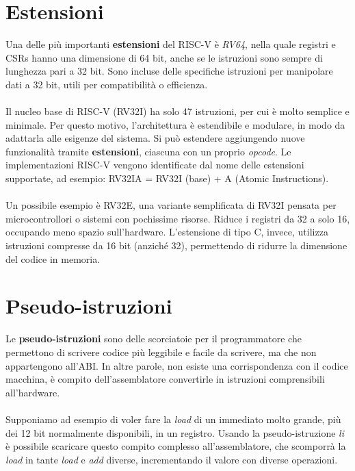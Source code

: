 \section{Estensioni}
Una delle più importanti \textbf{estensioni} del RISC-V è \textit{RV64}, nella quale registri e CSRs hanno una dimensione di 64 bit, anche se le istruzioni sono sempre di lunghezza pari a 32 bit. Sono incluse delle specifiche istruzioni per manipolare dati a 32 bit, utili per compatibilità o efficienza.
\\
\\
Il nucleo base di RISC-V (RV32I) ha solo 47 istruzioni, per cui è molto semplice e minimale. Per questo motivo, l'architettura è estendibile e modulare, in modo da adattarla alle esigenze del sistema. Si può estendere aggiungendo nuove funzionalità tramite \textbf{estensioni}, ciascuna con un proprio \textit{opcode}. Le implementazioni RISC-V vengono identificate dal nome delle estensioni supportate, ad esempio: RV32IA = RV32I (base) + A (Atomic Instructions).
\\
\\
Un possibile esempio è RV32E, una variante semplificata di RV32I pensata per microcontrollori o sistemi con pochissime risorse. Riduce i registri da 32 a solo 16, occupando meno spazio sull’hardware. L'estensione di tipo C, invece, utilizza istruzioni compresse da 16 bit (anziché 32), permettendo di ridurre la dimensione del codice in memoria.

\section{Pseudo-istruzioni}
\label{subsec:pseudo}
Le \textbf{pseudo-istruzioni} sono delle scorciatoie per il programmatore che permettono di scrivere codice più leggibile e facile da scrivere, ma che non appartengono all'ABI. In altre parole, non esiste una corrispondenza con il codice macchina, è compito dell'assemblatore convertirle in istruzioni comprensibili all'hardware.
\\
\\
Supponiamo ad esempio di voler fare la \textit{load} di un immediato molto grande, più dei 12 bit normalmente disponibili, in un registro. Usando la pseudo-istruzione \textit{li} è possibile scaricare questo compito complesso all'assemblatore, che scomporrà la \textit{load} in tante \textit{load} e \textit{add} diverse, incrementando il valore con diverse operazioni.

